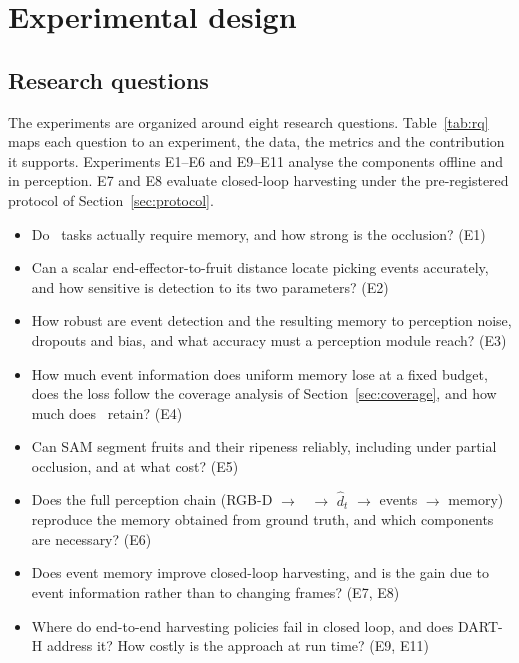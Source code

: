 \section{Experimental design}
\label{sec:design}

\subsection{Research questions}
The experiments are organized around eight research questions. Table~\ref{tab:rq} maps each question to an experiment, the data, the metrics and the contribution it supports. Experiments E1--E6 and E9--E11 analyse the components offline and in perception. E7 and E8 evaluate closed-loop harvesting under the pre-registered protocol of Section~\ref{sec:protocol}.
\begin{itemize}
\item[RQ1] Do \bench\ tasks actually require memory, and how strong is the occlusion? (E1)
\item[RQ2] Can a scalar end-effector-to-fruit distance locate picking events accurately, and how sensitive is detection to its two parameters? (E2)
\item[RQ3] How robust are event detection and the resulting memory to perception noise, dropouts and bias, and what accuracy must a perception module reach? (E3)
\item[RQ4] How much event information does uniform memory lose at a fixed budget, does the loss follow the coverage analysis of Section~\ref{sec:coverage}, and how much does \pekm\ retain? (E4)
\item[RQ5] Can SAM segment fruits and their ripeness reliably, including under partial occlusion, and at what cost? (E5)
\item[RQ6] Does the full perception chain (RGB-D $\rightarrow$ \fdm\ $\rightarrow$ $\hat d_t$ $\rightarrow$ events $\rightarrow$ memory) reproduce the memory obtained from ground truth, and which components are necessary? (E6)
\item[RQ7] Does event memory improve closed-loop harvesting, and is the gain due to event information rather than to changing frames? (E7, E8)
\item[RQ8] Where do end-to-end harvesting policies fail in closed loop, and does DART-H address it? How costly is the approach at run time? (E9, E11)
\end{itemize}

